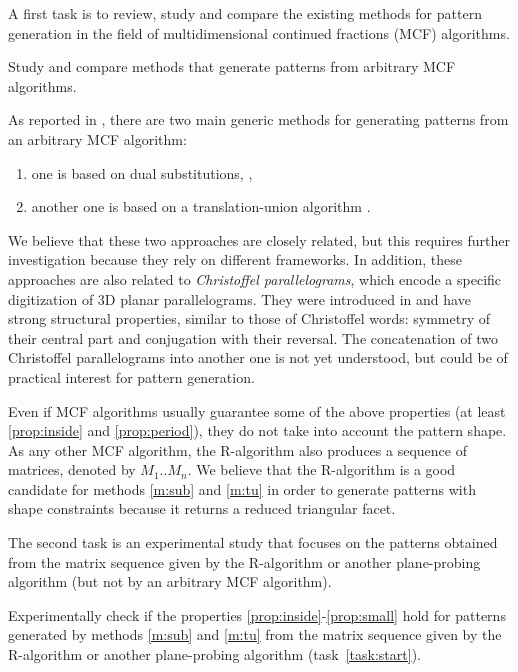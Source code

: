 A first task is to review, study and compare the existing methods for pattern generation
in the field of multidimensional continued fractions (MCF) algorithms. 
%
\begin{Task}
  \label{task:genmeth}
  Study and compare methods that generate patterns from arbitrary MCF algorithms. 
\end{Task}

As reported in , there are two main generic methods for generating patterns
from an arbitrary MCF algorithm:
\begin{enumerate}[label=(M\arabic*)]
\item one is based on dual substitutions, \eg \cite{Fernique2009}, \label{m:sub}
\item another one is based on a translation-union algorithm \cite{Jamet2016}. \label{m:tu}
\end{enumerate}
We believe that these two approaches are closely related, but this requires
further investigation because they rely on different frameworks.
In addition, these approaches are also related to \emph{Christoffel parallelograms},
which encode a specific digitization of 3D planar parallelograms. They were introduced in
\cite{Labbe2015} and have strong structural properties, similar to those of Christoffel words:
symmetry of their central part and conjugation with their reversal.
The concatenation of two Christoffel parallelograms into another one
is not yet understood, but could be of practical interest for pattern generation. 

Even if MCF algorithms usually guarantee some of the above properties
(at least \ref{prop:inside} and \ref{prop:period}), they do not take
into account the pattern shape. As any other MCF algorithm, the R-algorithm
also produces a sequence of matrices, denoted by $M_1..M_n$. We believe that the
R-algorithm is a good candidate for methods \ref{m:sub} and \ref{m:tu} in order
to generate patterns with shape constraints because it returns a reduced triangular facet.

The second task is an experimental study that focuses on the patterns obtained from
the matrix sequence given by the R-algorithm or another plane-probing algorithm (but
not by an arbitrary MCF algorithm).
%
\begin{Task}
  \label{task:genexp}
  Experimentally check if the properties \ref{prop:inside}-\ref{prop:small}
  hold for patterns generated by methods \ref{m:sub} and \ref{m:tu}
  from the matrix sequence given by the R-algorithm or another plane-probing algorithm
  (task~\ref{task:start}).   
\end{Task}

